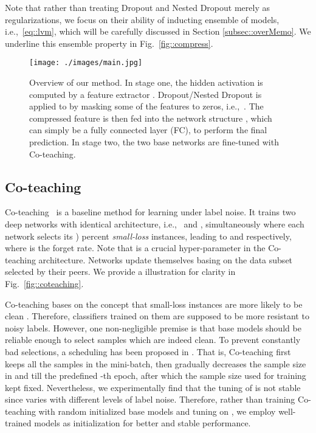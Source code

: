 \documentclass[journal]{IEEEtran}
\begin{document}
Note that rather than treating Dropout and Nested Dropout merely as regularizations, we focus on their ability of inducting ensemble of models, i.e.,~\eqref{eq::lvm}, which will be carefully discussed in Section \ref{subsec::overMemo}.
We underline this ensemble property in Fig.~\ref{fig::compress}.

\begin{figure}[t]
	\begin{minipage}[t]{0.45\textwidth}
		\centering  
		\texttt{[image: ./images/main.jpg]}
	\end{minipage}  
	\centering  
    \caption{Overview of our method. In stage one, the hidden activation  is computed by a feature extractor . 
    Dropout/Nested Dropout is applied to  by masking some of the features to zeros, i.e.,~. 
    The compressed feature  is then fed into the network structure , which can simply be a fully connected layer (FC), to perform the final prediction. 
    In stage two, the two base networks are fine-tuned with Co-teaching.}
	\label{fig::workflow}
	\vspace{-3mm}
\end{figure}

\subsection{Co-teaching} \label{subsec::co_teaching}
Co-teaching~\cite{han2018co} is a baseline method for learning under label noise.
It trains two deep networks with identical architecture, i.e.,~ and , simultaneously where each network selects its ) percent \textit{small-loss} instances, leading to  and  respectively, where
 is the forget rate.
Note that  is a crucial hyper-parameter in the Co-teaching architecture.
Networks update themselves basing on the data subset selected by their peers.
We provide a illustration for clarity in Fig.~\ref{fig::coteaching}.

Co-teaching bases on the concept that small-loss instances are more likely to be clean \cite{han2018co, jiang2018mentornet, yu2019does, tanaka2018joint, kumar2010self}.
Therefore, classifiers trained on them are supposed to be more resistant to noisy labels.
However, one non-negligible premise is that base models should be reliable enough to select samples which are indeed clean.
To prevent constantly bad selections, a scheduling has been proposed in \cite{han2018co}.
That is, Co-teaching first keeps all the samples in the mini-batch, then gradually decreases the sample size in  and  till the predefined -th epoch, after which the sample size used for training kept fixed.
Nevertheless, we experimentally find that the tuning of  is not stable since  varies with different levels of label noise.
Therefore, rather than training Co-teaching with random initialized base models and tuning on , we employ well-trained models as initialization for better and stable performance.
\end{document}
